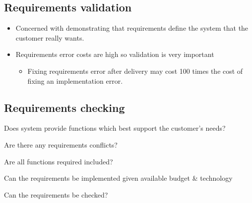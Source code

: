 \documentclass{report}
\newcommand{\textr}[1]{\textcolor{red}{#1}}
\begin{document}
\begin{multicols}{2}
\subsection{Requirements validation}
\begin{itemize}
  \item Concerned with demonstrating that requirements define the system that the customer really wants.
  \item Requirements error costs are high so validation is very important
  \begin{itemize}
    \item Fixing requirements error after delivery may cost 100 times the cost of fixing an implementation error.
  \end{itemize}
\end{itemize}
  
\subsection{Requirements checking}
\begin{description}[style=multiline,leftmargin=7em]
  \item [\textr{Validity}] Does system provide functions which best support
the customer's needs?
  \item [\textr{Consistency}] Are there any requirements conflicts?
  \item [\textr{Completeness}] Are all functions required included?
  \item [\textr{Realism}] Can the requirements be implemented given available budget
\& technology
  \item [\textr{Verifiability}] Can the requirements be checked?
\end{description}
\end{multicols}
\end{document}
